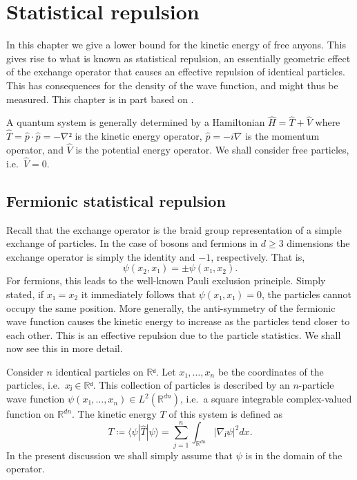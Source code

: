 
\chapter{Statistical repulsion}\label{chap:statistical repulsion}

In this chapter we give a lower bound for the kinetic energy of free anyons. This gives rise to what is known as statistical repulsion, an essentially geometric effect of the exchange operator that causes an effective repulsion of identical particles. This has consequences for the density of the wave function, and might thus be measured. This chapter is in part based on \cite{methmmp,lundholm-solovej,mancarella}.


A quantum system is generally determined by a Hamiltonian $\hat{H} = \hat{T} + \hat{V}$ where $\hat{T} = \hat{p}⋅\hat{p} = -∇²$ is the kinetic energy operator, $\hat{p} = -i∇$ is the momentum operator, and $\hat{V}$ is the potential energy operator. We shall consider free particles, i.e.\ $\hat{V} = 0.$






\section{Fermionic statistical repulsion}

Recall that the exchange operator is the braid group representation of a simple exchange of particles. In the case of bosons and fermions in $d ≥ 3$ dimensions the exchange operator is simply the identity and $-1$, respectively. That is,
\begin{equation}
  ψ(x_2, x₁) = \pm ψ(x₁, x_2).
\end{equation}
For fermions, this leads to the well-known Pauli exclusion principle. Simply stated, if $x₁ = x_2$ it immediately follows that $ψ(x₁, x₁) = 0$, the particles cannot occupy the same position. More generally, the anti-symmetry of the fermionic wave function causes the kinetic energy to increase as the particles tend closer to each other. This is an effective repulsion due to the particle statistics. We shall now see this in more detail.

Consider $n$ identical particles on $ℝᵈ$. Let $x₁, …, x_n$ be the coordinates of the particles, i.e.\ $xⱼ ∈ ℝᵈ$. This collection of particles is described by an $n$-particle wave function $ψ(x₁, …, x_n) ∈ L^2(ℝ^{dn})$, i.e.\ a square integrable complex-valued function on $ℝ^{dn}$. The kinetic energy $T$ of this system is defined as
\begin{equation}
  T ≔ ⟨ψ|\hat{T}|ψ⟩ = ∑_{j=1}^n ∫_{ℝ^{dn}} |∇ⱼ ψ|^2 dx.
\end{equation}
In the present discussion we shall simply assume that $ψ$ is in the domain of the operator.

